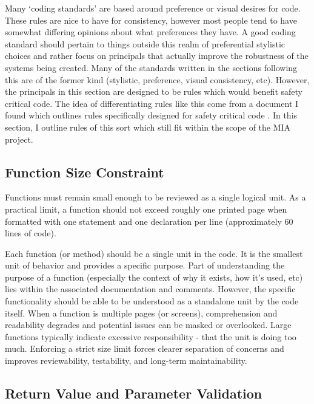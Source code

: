 Many `coding standards' are based around preference or visual desires for code. These rules are nice to have for consistency, however most people tend to have somewhat differing opinions about what preferences they have. A good coding standard should pertain to things outside this realm of preferential stylistic choices and rather focus on principals that actually improve the robustness of the systems being created. Many of the standards written in the sections following this are of the former kind (stylistic, preference, visual consistency, etc). However, the principals in this section are designed to be rules which would benefit safety critical code. The idea of differentiating rules like this come from a document I found which outlines rules specifically designed for safety critical code \cite{Rules_For_Developing_Safety_Critical_Code}. In this section, I outline rules of this sort which still fit within the scope of the MIA project.


\subsection{Function Size Constraint}

Functions must remain small enough to be reviewed as a single logical unit. As a practical limit, a function should not exceed roughly one printed page when formatted with one statement and one declaration per line (approximately 60 lines of code). \cite{Rules_For_Developing_Safety_Critical_Code}

Each function (or method) should be a single unit in the code. It is the smallest unit of behavior and provides a specific purpose. Part of understanding the purpose of a function (especially the context of why it exists, how it's used, etc) lies within the associated documentation and comments. However, the specific functionality should be able to be understood as a standalone unit by the code itself. When a function is multiple pages (or screens), comprehension and readability degrades and potential issues can be masked or overlooked. Large functions typically indicate excessive responsibility - that the unit is doing too much. Enforcing a strict size limit forces clearer separation of concerns and improves reviewability, testability, and long-term maintainability.



\subsection{Return Value and Parameter Validation}

